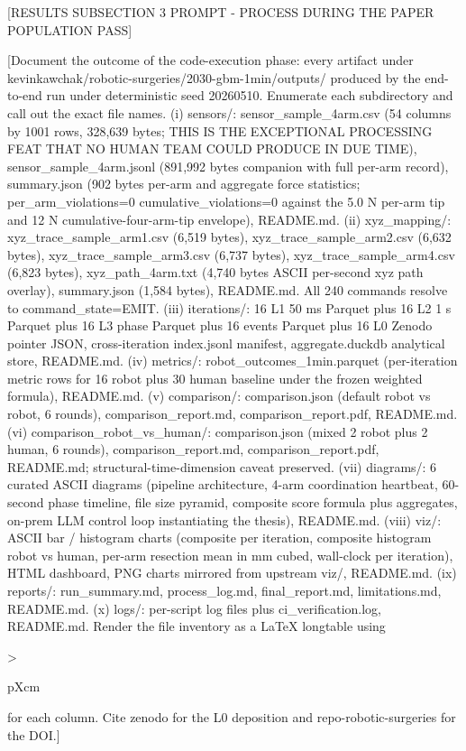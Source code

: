 [RESULTS SUBSECTION 3 PROMPT - PROCESS DURING THE PAPER POPULATION PASS]

[Document the outcome of the code-execution phase: every artifact
under kevinkawchak/robotic-surgeries/2030-gbm-1min/outputs/ produced
by the end-to-end run under deterministic seed 20260510. Enumerate
each subdirectory and call out the exact file names. (i) sensors/:
sensor_sample_4arm.csv (54 columns by 1001 rows, 328,639 bytes;
THIS IS THE EXCEPTIONAL PROCESSING FEAT THAT NO HUMAN TEAM COULD
PRODUCE IN DUE TIME), sensor_sample_4arm.jsonl (891,992 bytes
companion with full per-arm record), summary.json (902 bytes per-arm
and aggregate force statistics; per_arm_violations=0
cumulative_violations=0 against the 5.0 N per-arm tip and 12 N
cumulative-four-arm-tip envelope), README.md. (ii) xyz_mapping/:
xyz_trace_sample_arm1.csv (6,519 bytes), xyz_trace_sample_arm2.csv
(6,632 bytes), xyz_trace_sample_arm3.csv (6,737 bytes),
xyz_trace_sample_arm4.csv (6,823 bytes), xyz_path_4arm.txt
(4,740 bytes ASCII per-second xyz path overlay), summary.json
(1,584 bytes), README.md. All 240 commands resolve to
command_state=EMIT. (iii) iterations/: 16 L1 50 ms Parquet plus 16
L2 1 s Parquet plus 16 L3 phase Parquet plus 16 events Parquet plus
16 L0 Zenodo pointer JSON, cross-iteration index.jsonl manifest,
aggregate.duckdb analytical store, README.md. (iv) metrics/:
robot_outcomes_1min.parquet (per-iteration metric rows for 16 robot
plus 30 human baseline under the frozen weighted formula), README.md.
(v) comparison/: comparison.json (default robot vs robot, 6 rounds),
comparison_report.md, comparison_report.pdf, README.md. (vi)
comparison_robot_vs_human/: comparison.json (mixed 2 robot plus 2
human, 6 rounds), comparison_report.md, comparison_report.pdf,
README.md; structural-time-dimension caveat preserved. (vii)
diagrams/: 6 curated ASCII diagrams (pipeline architecture, 4-arm
coordination heartbeat, 60-second phase timeline, file size pyramid,
composite score formula plus aggregates, on-prem LLM control loop
instantiating the thesis), README.md. (viii) viz/: ASCII bar /
histogram charts (composite per iteration, composite histogram
robot vs human, per-arm resection mean in mm cubed, wall-clock per
iteration), HTML dashboard, PNG charts mirrored from upstream viz/,
README.md. (ix) reports/: run_summary.md, process_log.md,
final_report.md, limitations.md, README.md. (x) logs/: per-script log
files plus ci_verification.log, README.md. Render the file inventory
as a LaTeX longtable using {>{\raggedright\arraybackslash}p{Xcm}} for
each column. Cite zenodo for the L0 deposition and repo-robotic-surgeries
for the DOI.]

